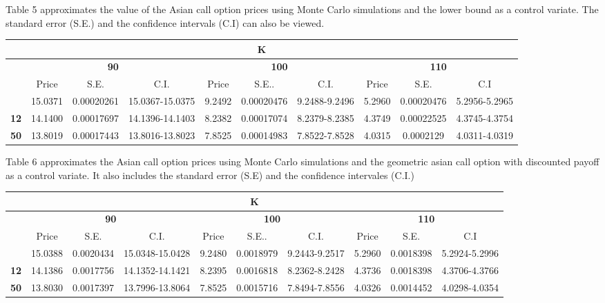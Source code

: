 \documentclass[10pt,oneside,a4paper]{article}
\begin{document}
\begin{flushleft}
\subsubsection{}
Table 5 approximates the value of the Asian call option prices using Monte Carlo simulations and the lower bound as a control variate.  The standard error (S.E.) and the confidence intervals (C.I) can also be viewed.
\begin{center}
\begin{tabular}{|c|c|c|c|c|c|c|c|c|c|}
\multicolumn{10}{c}{K} \tabularnewline
\hline
\multirow{3}{*}{} & \multicolumn{3}{c|}{\bfseries 90}  & \multicolumn{3}{c|}{\bfseries 100} & \multicolumn{3}{c|}{\bfseries 110} \\
\cline{2-10}
 & Price & S.E. & C.I. & Price & S.E.. & C.I. & Price & S.E. & C.I \\
\hline
 \bfseries 4 & 15.0371 &  0.00020261 & 15.0367-15.0375 & 9.2492 & 0.00020476 & 9.2488-9.2496 & 5.2960 & 0.00020476 & 5.2956-5.2965   \\
\hline
 \bfseries 12 & 14.1400 & 0.00017697 & 14.1396-14.1403 & 8.2382 & 0.00017074  & 8.2379-8.2385 & 4.3749 & 0.00022525 &4.3745-4.3754 \\
\hline
 \bfseries 50 & 13.8019 & 0.00017443 & 13.8016-13.8023 & 7.8525 & 0.00014983 & 7.8522-7.8528 & 4.0315 & 0.0002129& 4.0311-4.0319 \\
  \hline
\end{tabular}
\end{center}
 
Table 6 approximates the Asian call option prices using Monte Carlo simulations and the geometric asian call option with discounted payoff as a control variate. It also includes the standard error  (S.E) and the confidence intervales (C.I.)\begin{center}
\begin{tabular}{|c|c|c|c|c|c|c|c|c|c|}
\multicolumn{10}{c}{K} \tabularnewline
\hline
\multirow{3}{*}{} & \multicolumn{3}{c|}{\bfseries 90}  & \multicolumn{3}{c|}{\bfseries 100} & \multicolumn{3}{c|}{\bfseries 110} \\
\cline{2-10}
 & Price & S.E. & C.I. & Price & S.E.. & C.I. & Price & S.E. & C.I \\
\hline
 \bfseries 4 & 15.0388 &  0.0020434 & 15.0348-15.0428 & 9.2480 & 0.0018979 & 9.2443-9.2517 & 5.2960 & 0.0018398 & 5.2924-5.2996   \\
\hline
 \bfseries 12 & 14.1386 & 0.0017756 & 14.1352-14.1421 & 8.2395 & 0.0016818  & 8.2362-8.2428 & 4.3736 & 0.0018398 &4.3706-4.3766 \\
\hline
 \bfseries 50 & 13.8030 & 0.0017397 & 13.7996-13.8064 & 7.8525 & 0.0015716 & 7.8494-7.8556 & 4.0326 & 0.0014452 & 4.0298-4.0354 \\ 
  \hline
\end{tabular}
\end{center}


\end{flushleft}
\end{document}
